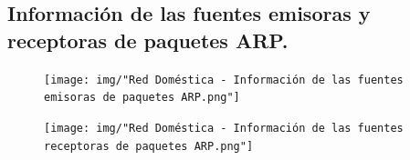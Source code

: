 
\subsection{Información de las fuentes emisoras y receptoras de paquetes ARP.}

\begin{figure}[h!]
    \centering                                                       
    \texttt{[image: img/"Red Doméstica - Información de las fuentes emisoras de paquetes ARP.png"]}
    \caption{}
    \label{domestica:emisoras}
\end{figure}

\begin{figure}[h!]
    \centering                                                       
    \texttt{[image: img/"Red Doméstica - Información de las fuentes receptoras de paquetes ARP.png"]}
    \caption{}
    \label{domestica:receptoras}
\end{figure}






